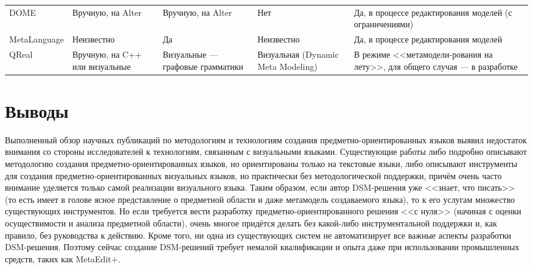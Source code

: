 \begin{table}[ht]
\begin{small}
\begin{longtabu} {| X[1 l p] | X[1 l p] | X[1 l p] | X[1 l p] | X[1 l p] |}
		DOME                         & Вручную, на Alter                             & Вручную, на Alter                              & Нет                                                 & Да, в процессе редактирования моделей (с ограничениями)                    \\
		MetaLanguage                 & Неизвестно                                    & Да                                             & Неизвестно                                          & Да, в процессе редактирования моделей                                      \\
		 QReal  & Вручную, на C++ или визуальные                & Визуальные --- графовые грамматики             & Визуальная (Dynamic Meta Modeling)                  & В режиме <<метамодели-рования на лету>>, для общего случая --- в разработке
		\label{tab:existingPlatformsAdditional}
	\end{longtabu}
\end{small}
\end{table}

\section{Выводы}
Выполненный обзор научных публикаций по методологиям и технологиям создания предметно-ориентированных 
языков выявил недостаток внимания со стороны исследователей к технологиям, связанным 
с визуальными языками. Существующие работы либо подробно описывают методологию создания 
предметно-ориентированных языков, но ориентированы только на текстовые языки, либо 
описывают инструменты для создания предметно-ориентированных визуальных языков, но 
практически без методологической поддержки, причём очень часто внимание уделяется 
только самой реализации визуального языка. Таким образом, если автор \ac{DSM}-решения уже 
<<знает, что писать>> (то есть имеет в голове ясное представление о предметной области 
и даже метамодель создаваемого языка), то к его услугам множество существующих инструментов. 
Но если требуется вести разработку предметно-ориентированного решения <<с нуля>> (начиная 
с оценки осуществимости и анализа предметной области), очень многое придётся делать 
без какой-либо инструментальной поддержки и, как правило, без руководства к действию.
Кроме того, ни одна из существующих систем не автоматизирует все важные аспекты разработки \ac{DSM}-решения.
Поэтому сейчас создание \ac{DSM}-решений требует немалой квалификации и опыта даже при 
использовании промышленных средств, таких как MetaEdit+.

